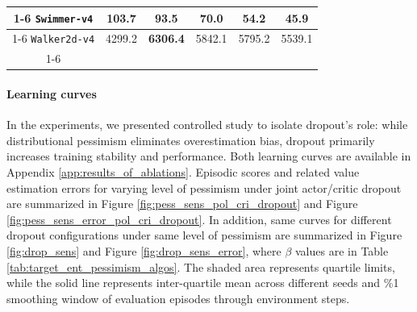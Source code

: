 \documentclass{article}
\begin{document}
\begin{table}[h!]
{\begin{tabular}{|c c c c c c|}
			\cline{1-6}
			\verb~Swimmer-v4~ & \textbf{103.7} & 93.5 & 70.0 & 54.2 & 45.9 \\
			\cline{1-6}
			\verb~Walker2d-v4~ & 4299.2 & \textbf{6306.4} & 5842.1 & 5795.2 & 5539.1 \\
			\cline{1-6}
			\hline
		\end{tabular}
	}
\end{table}


\paragraph{Learning curves} 

In the experiments, we presented controlled study to isolate dropout's role: while distributional pessimism eliminates overestimation bias, dropout primarily increases training stability and performance. Both learning curves are available in Appendix \ref{app:results_of_ablations}. Episodic scores and related value estimation errors for varying level of pessimism under joint actor/critic dropout are summarized in Figure \ref{fig:pess_sens_pol_cri_dropout} and Figure \ref{fig:pess_sens_error_pol_cri_dropout}.  In addition, same curves for different dropout configurations under same level of pessimism are summarized in Figure \ref{fig:drop_sens} and Figure \ref{fig:drop_sens_error}, where $\beta$ values are in Table \ref{tab:target_ent_pessimism_algos}. The shaded area represents quartile limits, while the solid line represents inter-quartile mean across different seeds and \%1 smoothing window of evaluation episodes through environment steps. 
\end{document}
